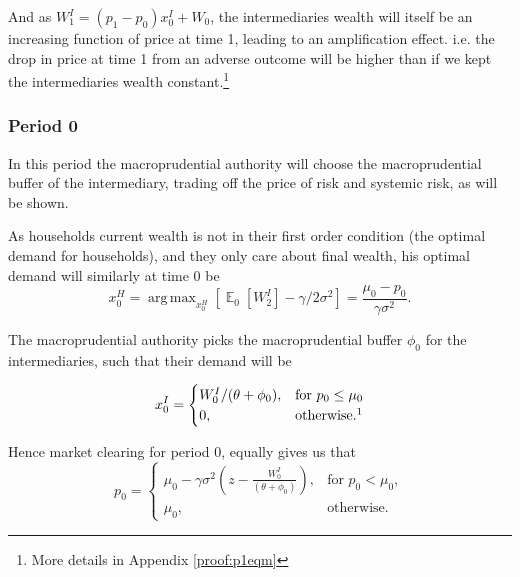 \documentclass[11pt]{article}
\DeclareMathOperator{\E}{\mathbb{E}} %
\DeclareMathOperator*{\argmax}{arg\,max} %
\begin{document}
And as $W^I_1 = (p_1 - p_0)x^I_0 + W_0$, the intermediaries wealth will itself be an increasing function of price at time 1, leading to an amplification effect. i.e. the drop in price at time 1 from an adverse outcome will be higher than if we kept the intermediaries wealth constant.\footnote{More details in Appendix \ref{proof:p1eqm}}

\subsubsection*{Period 0}
In this period the macroprudential authority will choose the macroprudential buffer of the intermediary, trading off the price of risk and systemic risk, as will be shown.

As households current wealth is not in their first order condition (the optimal demand for households), and they only care about final wealth, his optimal demand will similarly at time 0 be
\begin{equation}
x^{H}_0 = \argmax_{x^H_0}\left[\E_0[W^I_2] - \gamma/2\sigma^2\right]
= \frac{\mu_0 - p_0}{\gamma\sigma^2}.
\end{equation} 

The macroprudential authority picks the macroprudential buffer $\phi_0$ for the intermediaries, such that their demand will be

\begin{equation}
x^I_0 = \begin{cases}
 W^I_0/(\theta + \phi_0), &\text{for $p_0 \leq \mu_0$}\\
 0, &\text{otherwise.\footnotemark}
\end{cases}
\end{equation}

Hence market clearing for period 0, equally gives us that
 \begin{equation}
 p_0 = \begin{cases}
\mu_0 - \gamma\sigma^2 \left(z-\frac{W^I_0}{(\theta + \phi_0)}\right), &\text{for } p_0 < \mu_0,\\
\mu_0, &\text{otherwise.}
\end{cases}
 \end{equation}
\end{document}
